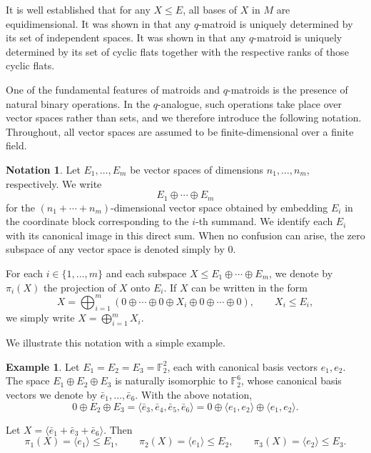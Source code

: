 \documentclass{article}
\theoremstyle{definition}
\newtheorem{example}[theorem]{{{Example}}}
\newtheorem{notation}[theorem]{{{Notation}}}
\begin{document}
It is well established that for any $X\leq E$, all bases of $X$ in $M$ are equidimensional. It was shown in \cite{JurriusPellikaan2018} that any $q$-matroid is uniquely determined by its set of independent spaces. It was shown in \cite{AlfaranoByrne2024CyclicFlats} that any $q$-matroid is uniquely determined by its set of cyclic flats together with the respective ranks of those cyclic flats.

One of the fundamental features of matroids and $q$-matroids is the presence of natural binary operations. In the $q$-analogue, such operations take place over vector spaces rather than sets, and we therefore introduce the following notation. Throughout, all vector spaces are assumed to be finite-dimensional over a finite field.

\begin{notation}
Let $E_1,\dots,E_m$ be vector spaces of dimensions $n_1,\dots,n_m$, respectively. We write
\[
E_1 \oplus \cdots \oplus E_m
\]
for the $(n_1+\cdots+n_m)$-dimensional vector space obtained by embedding $E_i$ in the coordinate block corresponding to the $i$-th summand. We identify each $E_i$ with its canonical image in this direct sum. When no confusion can arise, the zero subspace of any vector space is denoted simply by $0$.

For each $i \in \{1,\dots,m\}$ and each subspace $X \le E_1 \oplus \cdots \oplus E_m$, we denote by $\pi_i(X)$ the projection of $X$ onto $E_i$. If $X$ can be written in the form
\[
X=\bigoplus_{i=1}^m
(0\oplus\cdots\oplus0\oplus X_i\oplus0\oplus\cdots\oplus0),
\qquad X_i \le E_i,
\]
we simply write $X=\bigoplus_{i=1}^m X_i$.
\end{notation}

We illustrate this notation with a simple example.

\begin{example}
Let $E_1=E_2=E_3=\mathbb{F}_2^2$, each with canonical basis vectors $e_1,e_2$. The space
$E_1\oplus E_2\oplus E_3$
is naturally isomorphic to $\mathbb{F}_2^6$, whose canonical basis vectors we denote by $\bar e_1,\dots,\bar e_6$. With the above notation,
\[
0\oplus E_2\oplus E_3
=\langle \bar e_3,\bar e_4,\bar e_5,\bar e_6\rangle
=0\oplus\langle e_1,e_2\rangle\oplus\langle e_1,e_2\rangle.
\]

Let $X=\langle \bar e_1+\bar e_3+\bar e_6\rangle.$ Then
\[
\pi_1(X)=\langle e_1\rangle\le E_1,\qquad
\pi_2(X)=\langle e_1\rangle\le E_2,\qquad
\pi_3(X)=\langle e_2\rangle\le E_3.
\]
\end{example}
\end{document}
